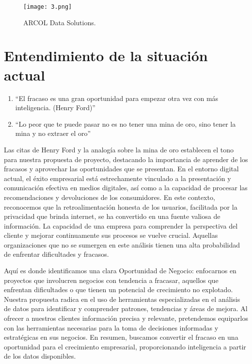 \documentclass[12pt]{article}
\begin{document}
\begin{figure}[H]
  \centering
  \texttt{[image: 3.png]}
  \caption{ARCOL Data Solutions.}
  \label{fig:ARCOL Data Solutions}
\end{figure}

\section{Entendimiento de la situación actual}
\begin{enumerate}
    \item “El fracaso es una gran oportunidad para empezar otra vez con más inteligencia. (Henry Ford)”
    \item “Lo peor que te puede pasar no es no tener una mina de oro, sino tener la mina y no extraer el oro”
\end{enumerate}
Las citas de Henry Ford y la analogía sobre la mina de oro establecen el tono para nuestra propuesta de proyecto, destacando la importancia de aprender de los fracasos y aprovechar las oportunidades que se presentan. En el entorno digital actual, el éxito empresarial está estrechamente vinculado a la presentación y comunicación efectiva en medios digitales, así como a la capacidad de procesar las recomendaciones y devoluciones de los consumidores. En este contexto, reconocemos que la retroalimentación honesta de los usuarios, facilitada por la privacidad que brinda internet, se ha convertido en una fuente valiosa de información. La capacidad de una empresa para comprender la perspectiva del cliente y mejorar continuamente sus procesos se vuelve crucial. Aquellas organizaciones que no se sumergen en este análisis tienen una alta probabilidad de enfrentar dificultades y fracasos.

Aquí es donde identificamos una clara Oportunidad de Negocio: enfocarnos en proyectos que involucren negocios con tendencia a fracasar, aquellos que enfrentan dificultades o que tienen un potencial de crecimiento no explotado. Nuestra propuesta radica en el uso de herramientas especializadas en el análisis de datos para identificar y comprender patrones, tendencias y áreas de mejora. Al ofrecer a nuestros clientes información precisa y relevante, pretendemos equiparlos con las herramientas necesarias para la toma de decisiones informadas y estratégicas en sus negocios. En resumen, buscamos convertir el fracaso en una oportunidad para el crecimiento empresarial, proporcionando inteligencia a partir de los datos disponibles.
\end{document}
